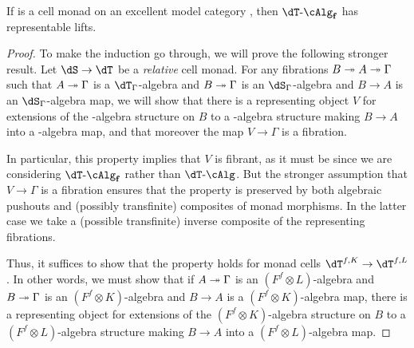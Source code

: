 \documentclass{amsart}
\def\alg{\text{-}\cAlg}
\def\algf{\alg_{\mathbf{f}}}
\begin{document}
\begin{thm}\label{thm:cell-replift}
  If \dT is a cell monad on an excellent model category \sM, then $\dT\algf$ has representable lifts.
\end{thm}
\begin{proof}
  To make the induction go through, we will prove the following stronger result.
  Let $\dS\to\dT$ be a \emph{relative} cell monad.
  For any fibrations $B\twoheadrightarrow A\twoheadrightarrow \Gamma$ such that $A\twoheadrightarrow \Gamma$ is a $\dT_\Gamma$-algebra and $B\twoheadrightarrow\Gamma$ is an $\dS_\Gamma$-algebra and $B\to A$ is an $\dS_\Gamma$-algebra map, we will show that there is a representing object $V$ for extensions of the \dS-algebra structure on $B$ to a \dT-algebra structure making $B\to A$ into a \dT-algebra map, and that moreover the map $V\to\Gamma$ is a fibration.

  In particular, this property implies that $V$ is fibrant, as it must be since we are considering $\dT\algf$ rather than $\dT\alg$.
  But the stronger assumption that $V\to\Gamma$ is a fibration ensures that the property is preserved by both algebraic pushouts and (possibly transfinite) composites of monad morphisms.
  In the latter case we take a (possible transfinite) inverse composite of the representing fibrations.

  Thus, it suffices to show that the property holds for monad cells $\dT^{f,K} \to \dT^{f,L}$.
  In other words, we must show that if $A\twoheadrightarrow \Gamma$ is an $(F^f\otimes L)$-algebra and $B\twoheadrightarrow\Gamma$ is an $(F^f\otimes K)$-algebra and $B\to A$ is a $(F^f\otimes K)$-algebra map, there is a representing object for extensions of the $(F^f\otimes K)$-algebra structure on $B$ to a $(F^f\otimes L)$-algebra structure making $B\to A$ into a $(F^f\otimes L)$-algebra map.


\end{proof}
\end{document}
